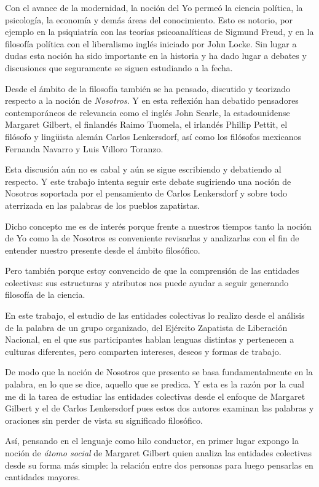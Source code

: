 \documentclass[oneside]{book}
\begin{document}
Con el avance de la modernidad, la noción del Yo permeó la ciencia política, la psicología, la economía y demás áreas del conocimiento. Esto es notorio, por ejemplo en la psiquiatría con las teorías psicoanalíticas de Sigmund Freud\cite{Freud}, y en la filosofía política con el liberalismo inglés iniciado por John Locke\cite{Locke}. Sin lugar a dudas esta noción ha sido importante en la historia y ha dado lugar a debates y discusiones que seguramente se siguen estudiando a la fecha.

Desde el ámbito de la filosofía también se ha pensado, discutido y teorizado respecto a la noción de \textit{Nosotros}. Y en esta reflexión han debatido pensadores contemporáneos de relevancia como el inglés John Searle, la estadounidense Margaret Gilbert, el finlandés Raimo Tuomela, el irlandés Phillip Pettit, el filósofo y lingüista alemán Carlos Lenkersdorf, así como los filósofos mexicanos Fernanda Navarro y Luis Villoro Toranzo.

Esta discusión aún no es cabal y aún se sigue escribiendo y debatiendo al respecto. Y este trabajo intenta seguir este debate sugiriendo una noción de Nosotros soportada por el pensamiento de Carlos Lenkersdorf  y sobre todo aterrizada en las palabras de los pueblos zapatistas.

Dicho concepto me es de interés porque frente a nuestros tiempos tanto la noción de Yo como la de Nosotros es conveniente revisarlas y analizarlas con el fin de entender nuestro presente desde el ámbito filosófico.

Pero también porque estoy convencido de que la comprensión de las entidades colectivas: sus estructuras y atributos nos puede ayudar a seguir generando filosofía de la ciencia. 

En este trabajo, el estudio de las entidades colectivas lo realizo desde el análisis de la palabra de un grupo organizado, del Ejército Zapatista de Liberación Nacional, en el que sus participantes hablan lenguas distintas y pertenecen a culturas diferentes, pero comparten intereses, deseos y formas de trabajo.

De modo que la noción de Nosotros que presento se basa fundamentalmente en la palabra, en lo que se dice, aquello que se predica. Y esta es la razón por la cual me di la tarea de estudiar las entidades colectivas desde el enfoque de Margaret Gilbert y el de Carlos Lenkersdorf pues estos dos autores examinan las palabras y oraciones sin perder de vista su significado filosófico.

Así, pensando en el lenguaje como hilo conductor, en primer lugar expongo la noción de \textit{átomo social} de Margaret Gilbert quien analiza las entidades colectivas desde su forma más simple: la relación entre dos personas para luego pensarlas en cantidades mayores. 
\end{document}
